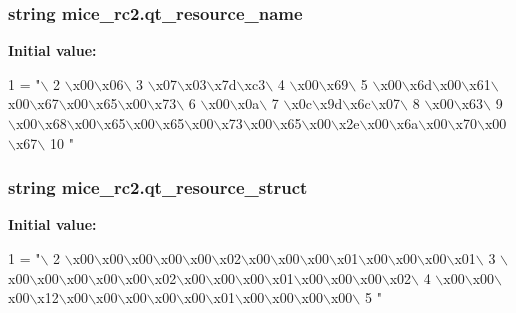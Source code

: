 \subsubsection[{qt\+\_\+resource\+\_\+name}]{\setlength{\rightskip}{0pt plus 5cm}string mice\+\_\+rc2.\+qt\+\_\+resource\+\_\+name}\label{namespacemice__rc2_a3caae7f260503476016e579bd4f960fc}
{\bfseries Initial value\+:}
\begin{DoxyCode}
1 = \textcolor{stringliteral}{"\(\backslash\)}
2 \textcolor{stringliteral}{\(\backslash\)x00\(\backslash\)x06\(\backslash\)}
3 \textcolor{stringliteral}{\(\backslash\)x07\(\backslash\)x03\(\backslash\)x7d\(\backslash\)xc3\(\backslash\)}
4 \textcolor{stringliteral}{\(\backslash\)x00\(\backslash\)x69\(\backslash\)}
5 \textcolor{stringliteral}{\(\backslash\)x00\(\backslash\)x6d\(\backslash\)x00\(\backslash\)x61\(\backslash\)x00\(\backslash\)x67\(\backslash\)x00\(\backslash\)x65\(\backslash\)x00\(\backslash\)x73\(\backslash\)}
6 \textcolor{stringliteral}{\(\backslash\)x00\(\backslash\)x0a\(\backslash\)}
7 \textcolor{stringliteral}{\(\backslash\)x0c\(\backslash\)x9d\(\backslash\)x6c\(\backslash\)x07\(\backslash\)}
8 \textcolor{stringliteral}{\(\backslash\)x00\(\backslash\)x63\(\backslash\)}
9 \textcolor{stringliteral}{\(\backslash\)x00\(\backslash\)x68\(\backslash\)x00\(\backslash\)x65\(\backslash\)x00\(\backslash\)x65\(\backslash\)x00\(\backslash\)x73\(\backslash\)x00\(\backslash\)x65\(\backslash\)x00\(\backslash\)x2e\(\backslash\)x00\(\backslash\)x6a\(\backslash\)x00\(\backslash\)x70\(\backslash\)x00\(\backslash\)x67\(\backslash\)}
10 \textcolor{stringliteral}{"}
\end{DoxyCode}
\hypertarget{namespacemice__rc2_a1c573edc99ae0d6aada1fa27896a460a}{}
\subsubsection[{qt\+\_\+resource\+\_\+struct}]{\setlength{\rightskip}{0pt plus 5cm}string mice\+\_\+rc2.\+qt\+\_\+resource\+\_\+struct}\label{namespacemice__rc2_a1c573edc99ae0d6aada1fa27896a460a}
{\bfseries Initial value\+:}
\begin{DoxyCode}
1 = \textcolor{stringliteral}{"\(\backslash\)}
2 \textcolor{stringliteral}{\(\backslash\)x00\(\backslash\)x00\(\backslash\)x00\(\backslash\)x00\(\backslash\)x00\(\backslash\)x02\(\backslash\)x00\(\backslash\)x00\(\backslash\)x00\(\backslash\)x01\(\backslash\)x00\(\backslash\)x00\(\backslash\)x00\(\backslash\)x01\(\backslash\)}
3 \textcolor{stringliteral}{\(\backslash\)x00\(\backslash\)x00\(\backslash\)x00\(\backslash\)x00\(\backslash\)x00\(\backslash\)x02\(\backslash\)x00\(\backslash\)x00\(\backslash\)x00\(\backslash\)x01\(\backslash\)x00\(\backslash\)x00\(\backslash\)x00\(\backslash\)x02\(\backslash\)}
4 \textcolor{stringliteral}{\(\backslash\)x00\(\backslash\)x00\(\backslash\)x00\(\backslash\)x12\(\backslash\)x00\(\backslash\)x00\(\backslash\)x00\(\backslash\)x00\(\backslash\)x00\(\backslash\)x01\(\backslash\)x00\(\backslash\)x00\(\backslash\)x00\(\backslash\)x00\(\backslash\)}
5 \textcolor{stringliteral}{"}
\end{DoxyCode}
